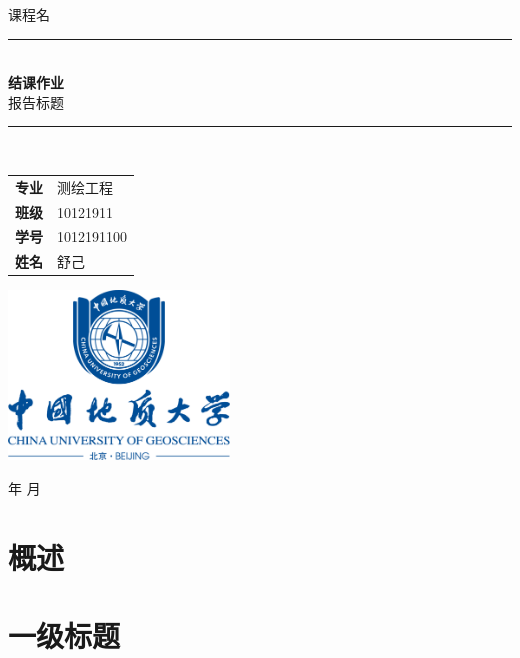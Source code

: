 \documentclass[12pt,a4paper]{article}
\begin{document}
\renewcommand{\today}{\number\year 年 \number\month 月}
\begin{titlepage}
    \clearpage\thispagestyle{empty}
    \centering
    \vspace{1cm}

    {\fangsong 课程名}
    \vspace{2.5cm}

    \rule{\linewidth}{2mm} \\[0.5cm]
    { \Huge \kaishu \textbf{结课作业}\\[0.2em]
    报告标题}\\[0.5cm]
    \rule{\linewidth}{0.6mm} \\[3.4cm]

    \hspace{2cm}
    \begin{tabular}{l p{5cm}}
        \textbf{专业} & 测绘工程   \\[18pt]
        \textbf{班级} & 10121911   \\[18pt]
        \textbf{学号} & 1012191100 \\[18pt]
        \textbf{姓名} & 舒己
    \end{tabular}

    \vspace{1.5cm}
    \centering \includegraphics[height=4.5cm]{校徽与中英文（蓝色中轴式）.png}\\ %
    \vspace{1.5cm}
    \begin{center}
        \today
    \end{center}
\end{titlepage}
\tableofcontents\thispagestyle{empty}
\newpage
\setcounter{page}{1}
\section{概述}

\section{一级标题}
\end{document}
